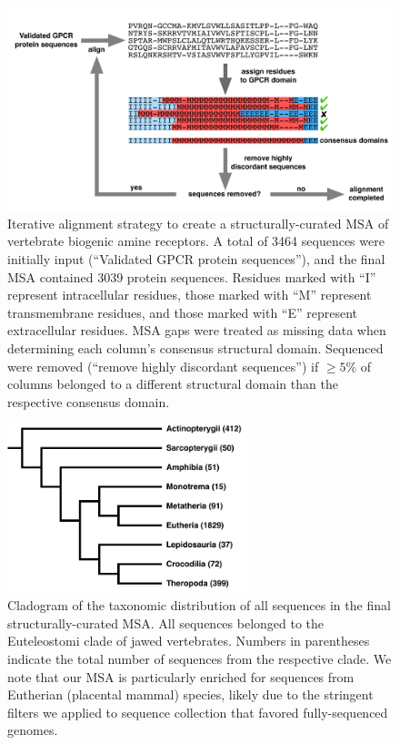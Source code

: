 \documentclass[fleqn,10pt]{wlpeerj}
\begin{document}
\begin{figure}[htbp]
	\centerline{\includegraphics[width=18cm]{figures/alignment_flowchart.pdf}}
	\caption{\label{flowchart} Iterative alignment strategy to create a structurally-curated MSA of vertebrate biogenic amine receptors. A total of 3464 sequences were initially input (``Validated GPCR protein sequences''), and the final MSA contained 3039 protein sequences. Residues marked with ``I'' represent intracellular residues, those marked with ``M'' represent transmembrane residues, and those marked with ``E'' represent extracellular residues. MSA gaps were treated as missing data when determining each column's consensus structural domain. Sequenced were removed (``remove highly discordant sequences'') if $\geq 5\%$ of columns belonged to a different structural domain than the respective consensus domain.}
\end{figure}

\begin{figure}[htbp]
	\centerline{\includegraphics[width=7cm]{figures/taxonomic_distribution.pdf}}
	\caption{\label{taxa_dist} Cladogram of the taxonomic distribution of all sequences in the final structurally-curated MSA. All sequences belonged to the Euteleostomi clade of jawed vertebrates. Numbers in parentheses indicate the total number of sequences from the respective clade. We note that our MSA is particularly enriched for sequences from Eutherian (placental mammal) species, likely due to the stringent filters we applied to sequence collection that favored fully-sequenced genomes.}
\end{figure}
\end{document}
